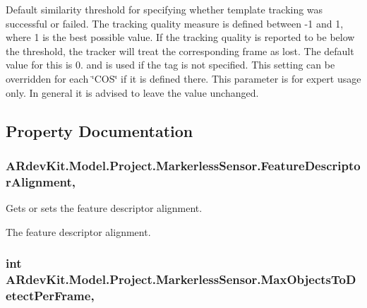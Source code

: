 Default similarity threshold for specifying whether template tracking was successful or failed. The tracking quality measure is defined between -\/1 and 1, where 1 is the best possible value. If the tracking quality is reported to be below the threshold, the tracker will treat the corresponding frame as lost. The default value for this is 0. and is used if the tag is not specified. This setting can be overridden for each \char`\"{}\-C\-O\-S\char`\"{} if it is defined there. This parameter is for expert usage only. In general it is advised to leave the value unchanged. 



\subsection{Property Documentation}
\hypertarget{class_a_rdev_kit_1_1_model_1_1_project_1_1_markerless_sensor_a16b0d056f8ce0a6e79bdb23df1222fd4}{
\subsubsection[{Feature\-Descriptor\-Alignment}]{ A\-Rdev\-Kit.\-Model.\-Project.\-Markerless\-Sensor.\-Feature\-Descriptor\-Alignment\hspace{0.3cm}{\ttfamily [get]}, {\ttfamily [set]}}}\label{class_a_rdev_kit_1_1_model_1_1_project_1_1_markerless_sensor_a16b0d056f8ce0a6e79bdb23df1222fd4}


Gets or sets the feature descriptor alignment. 

The feature descriptor alignment. \hypertarget{class_a_rdev_kit_1_1_model_1_1_project_1_1_markerless_sensor_ae9ea2cf4d222d4ac0277562b25b6619a}{
\subsubsection[{Max\-Objects\-To\-Detect\-Per\-Frame}]{\setlength{\rightskip}{0pt plus 5cm}int A\-Rdev\-Kit.\-Model.\-Project.\-Markerless\-Sensor.\-Max\-Objects\-To\-Detect\-Per\-Frame\hspace{0.3cm}{\ttfamily [get]}, {\ttfamily [set]}}}\label{class_a_rdev_kit_1_1_model_1_1_project_1_1_markerless_sensor_ae9ea2cf4d222d4ac0277562b25b6619a}


